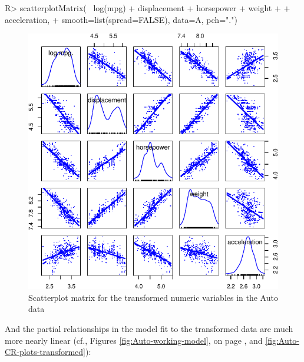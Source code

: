 \documentclass[
]{jss}
\begin{document}
\begin{CodeChunk}
\begin{CodeInput}
R> scatterplotMatrix(~ log(mpg) + displacement + horsepower + weight 
+                   + acceleration, 
+                   smooth=list(spread=FALSE), data=A, pch=".")
\end{CodeInput}
\begin{figure}

{\centering \includegraphics[width=0.6\linewidth]{JSS-article-reduced-2_files/figure-latex/Auto-transformed-scatterplot-matrix-1} 

}

\caption[Scatterplot matrix for the transformed numeric variables in the Auto data]{Scatterplot matrix for the transformed numeric variables in the Auto data}\label{fig:Auto-transformed-scatterplot-matrix}
\end{figure}
\end{CodeChunk}

And the partial relationships in the model fit to the transformed data
are much more nearly linear (cf., Figures \ref{fig:Auto-working-model},
on page \pageref{fig:Auto-working-model}, and
\ref{fig:Auto-CR-plots-transformed}):
\end{document}

